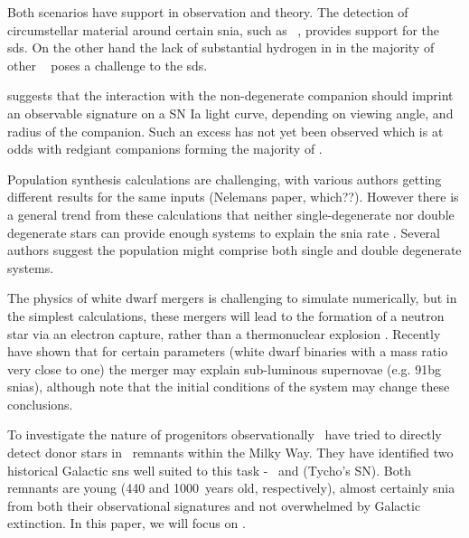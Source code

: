 Both scenarios have support in observation and theory. The detection of circumstellar material around certain \gls{snia}, such as \ \citep{2007Sci...317..924P}, provides support for the \gls{sds}. On the other hand the lack of substantial hydrogen in in the majority of other \sneia\ \citep{2007ApJ...670.1275L} poses a challenge to the \gls{sds}.


\citet{2010ApJ...708.1025K} suggests that the interaction with the non-degenerate companion should imprint an observable signature on a SN Ia  light curve, depending on viewing angle, and radius of the companion. Such an excess has not yet been observed \citep{2010ApJ...722.1691H, 2011Ap&SS.tmp...40T, 2011arXiv1106.4008B} which is at odds with \gls{redgiant} companions forming the majority of \sneia.

Population synthesis calculations are challenging, with various authors getting different results for the same inputs (Nelemans paper, which??). However there is a general trend from these calculations that neither single-degenerate nor double degenerate stars can provide enough systems to explain the \gls{snia} rate \citep{2009ApJ...699.2026R, 2010A&A...515A..89M,2010A&A...521A..85Y,2008ApJ...677L.109H}. Several authors suggest the population might comprise both single and double degenerate systems.

The physics of white dwarf mergers is challenging to simulate numerically, but in the simplest calculations, these mergers will lead to the formation of a neutron star via an electron capture, rather than a thermonuclear explosion \citep{1985A&A...150L..21S}. Recently \citet{2010Natur.463...61P} have shown that for certain parameters (white dwarf binaries with a mass ratio very close to one) the merger may explain sub-luminous supernovae (e.g. \gls{91bg} \glspl{snia}), although \citet{2011arXiv1101.5132D} note that the initial conditions of the system may change these conclusions.

To investigate the nature of progenitors observationally \rl\ have tried to directly detect donor stars in \snia\ remnants within the Milky Way. They have identified two historical Galactic \glspl{sn} well suited to this task - \ and  (Tycho's SN). Both remnants are young (440 and 1000~years old, respectively), almost certainly \gls{snia} from both their observational signatures \citep{2006ApJ...645.1373B,2004ApJ...612..357R} and not overwhelmed by Galactic extinction. In this paper, we will focus on . 

